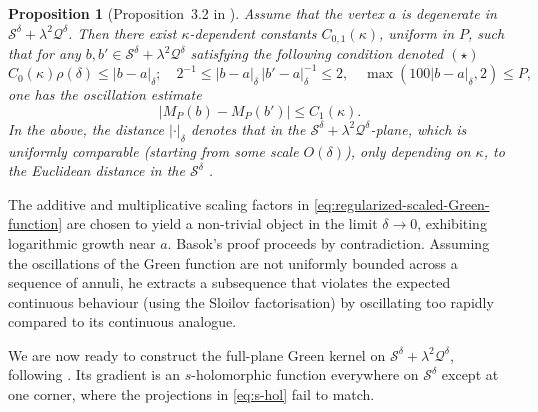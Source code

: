 \documentclass[reqno]{amsart}
\numberwithin{equation}{section}
\newtheorem{prop}[theo]{Proposition}
\theoremstyle{definition}
\theoremstyle{remark}
\newcommand\cQ{\mathcal{Q}}
\newcommand\cS{\mathcal{S}}
\begin{document}
\begin{prop}[Proposition~3.2 in \cite{Bas23}]\label{prop:regulatization-RW}
Assume that the vertex $a$ is degenerate in $\cS^\delta + \lambda^2\cQ^\delta$. Then there exist $\kappa$-dependent constants $C_{0,1}(\kappa)$, uniform in $P$, such that for any $b,b' \in \cS^\delta + \lambda^2 \cQ^\delta$ satisfying the following condition denoted $(\star) $
\[
C_0(\kappa)\rho(\delta) \leq |b-a|_{\delta}; \quad 
2^{-1} \leq |b-a|_{\delta}\,|b'-a|_{\delta}^{-1} \leq 2, \quad \max(100|b-a|_{\delta}, 2) \leq 
P ,
\]
one has the oscillation estimate
\begin{equation}
|M_{P}(b) - M_{P}(b')| \leq C_1(\kappa).
\end{equation}
In the above, the distance $|\cdot|_{\delta}$ denotes that in the $\cS^\delta + \lambda^2 \cQ^\delta$-plane, which is uniformly comparable (starting from some scale $O(\delta)$), only depending on $\kappa$, to the Euclidean distance in the $\cS^\delta$ .
\end{prop}

The additive and multiplicative scaling factors in \eqref{eq:regularized-scaled-Green-function} are chosen to yield a non-trivial object in the limit $\delta \to 0$, exhibiting logarithmic growth near $a$. Basok's proof proceeds by contradiction. Assuming the oscillations of the Green function are not uniformly bounded across a sequence of annuli, he extracts a subsequence that violates the expected continuous behaviour (using the Sloilov factorisation) by oscillating too rapidly compared to its continuous analogue.

We are now ready to construct the full-plane Green kernel on $\cS^\delta + \lambda^2 \cQ^\delta$, following \cite[Section~3]{Bas23}. Its gradient is an $s$-holomorphic function everywhere on $\cS^\delta$ except at one corner, where the projections in \eqref{eq:s-hol} fail to match.
\end{document}
